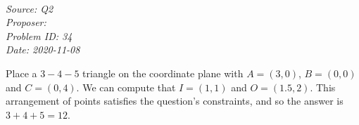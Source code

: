 \SSbreak\\
\emph{Source:  Q2}\\
\emph{Proposer: \Pss}\\
\emph{Problem ID: 34}\\
\emph{Date: 2020-11-08}\\
\SSbreak

\bigskip 

\begin{solution}\hfil\medskip

    Place a $3-4-5$ triangle on the coordinate plane with $A = (3, 0)$, $B = (0, 0)$ and $C = (0, 4)$. 
    We can compute that $I = (1, 1)$ and $O = (1.5, 2)$. 
    This arrangement of points satisfies the question's constraints, and so the answer is $3 + 4 + 5 = \boxed{12}$. 
\end{solution}\bigskip